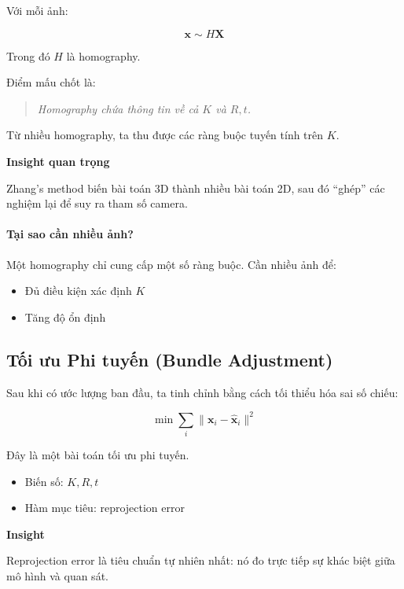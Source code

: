 Với mỗi ảnh:

\[
\mathbf{x} \sim H \mathbf{X}
\]

Trong đó $H$ là homography.

Điểm mấu chốt là:

\begin{quote}
	\textit{Homography chứa thông tin về cả $K$ và $R,t$.}
\end{quote}

Từ nhiều homography, ta thu được các ràng buộc tuyến tính trên $K$.

\begin{mdframed}[style=infobox]
	\textbf{Insight quan trọng}
	
	Zhang's method biến bài toán 3D thành nhiều bài toán 2D, sau đó “ghép” các nghiệm lại để suy ra tham số camera.
\end{mdframed}

\paragraph{Tại sao cần nhiều ảnh?}

Một homography chỉ cung cấp một số ràng buộc. Cần nhiều ảnh để:
\begin{itemize}
	\item Đủ điều kiện xác định $K$
	\item Tăng độ ổn định
\end{itemize}

\subsection{Tối ưu Phi tuyến (Bundle Adjustment)}
\label{subsec:bundle_adjustment}

Sau khi có ước lượng ban đầu, ta tinh chỉnh bằng cách tối thiểu hóa sai số chiếu:

\[
\min \sum_i \|\mathbf{x}_i - \hat{\mathbf{x}}_i\|^2
\]

Đây là một bài toán tối ưu phi tuyến.

\begin{itemize}
	\item Biến số: $K, R, t$
	\item Hàm mục tiêu: reprojection error
\end{itemize}

\begin{mdframed}[style=infobox]
	\textbf{Insight}
	
	Reprojection error là tiêu chuẩn tự nhiên nhất: nó đo trực tiếp sự khác biệt giữa mô hình và quan sát.
\end{mdframed}

